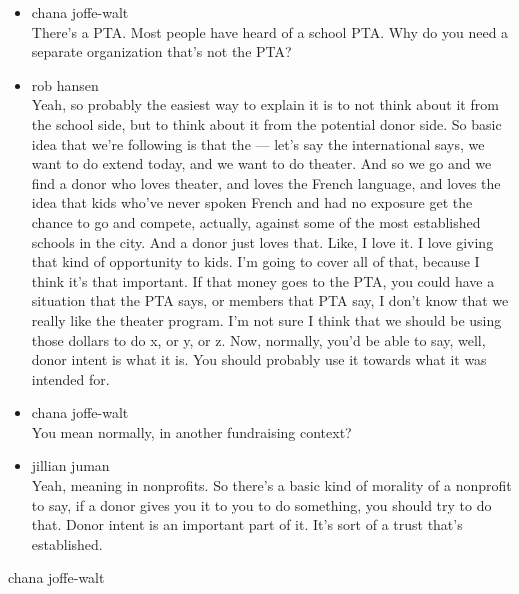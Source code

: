 \begin{itemize}
\item
  chana joffe-walt\\
  There's a PTA. Most people have heard of a school PTA. Why do you need
  a separate organization that's not the PTA?
\item
  rob hansen\\
  Yeah, so probably the easiest way to explain it is to not think about
  it from the school side, but to think about it from the potential
  donor side. So basic idea that we're following is that the --- let's
  say the international says, we want to do extend today, and we want to
  do theater. And so we go and we find a donor who loves theater, and
  loves the French language, and loves the idea that kids who've never
  spoken French and had no exposure get the chance to go and compete,
  actually, against some of the most established schools in the city.
  And a donor just loves that. Like, I love it. I love giving that kind
  of opportunity to kids. I'm going to cover all of that, because I
  think it's that important. If that money goes to the PTA, you could
  have a situation that the PTA says, or members that PTA say, I don't
  know that we really like the theater program. I'm not sure I think
  that we should be using those dollars to do x, or y, or z. Now,
  normally, you'd be able to say, well, donor intent is what it is. You
  should probably use it towards what it was intended for.
\item
  chana joffe-walt\\
  You mean normally, in another fundraising context?
\item
  jillian juman\\
  Yeah, meaning in nonprofits. So there's a basic kind of morality of a
  nonprofit to say, if a donor gives you it to you to do something, you
  should try to do that. Donor intent is an important part of it. It's
  sort of a trust that's established.
\end{itemize}

chana joffe-walt

